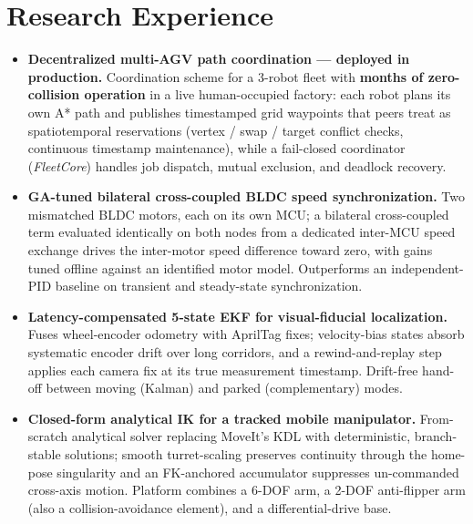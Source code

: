 \documentclass[a4paper,20pt]{article}
\begin{document}
\vspace{2pt}
\section{\textbf{Research Experience}}

\begin{itemize}[leftmargin=*]

    \item \textbf{Decentralized multi-AGV path coordination --- deployed in production.} Coordination scheme for a 3-robot fleet with \textbf{months of zero-collision operation} in a live human-occupied factory: each robot plans its own A* path and publishes timestamped grid waypoints that peers treat as spatiotemporal reservations (vertex / swap / target conflict checks, continuous timestamp maintenance), while a fail-closed coordinator (\textit{FleetCore}) handles job dispatch, mutual exclusion, and deadlock recovery. \vspace{-5pt}

    \item \textbf{GA-tuned bilateral cross-coupled BLDC speed synchronization.} Two mismatched BLDC motors, each on its own MCU; a bilateral cross-coupled term evaluated identically on both nodes from a dedicated inter-MCU speed exchange drives the inter-motor speed difference toward zero, with gains tuned offline against an identified motor model. Outperforms an independent-PID baseline on transient and steady-state synchronization. \vspace{-5pt}

    \item \textbf{Latency-compensated 5-state EKF for visual-fiducial localization.} Fuses wheel-encoder odometry with AprilTag fixes; velocity-bias states absorb systematic encoder drift over long corridors, and a rewind-and-replay step applies each camera fix at its true measurement timestamp. Drift-free hand-off between moving (Kalman) and parked (complementary) modes. \vspace{-5pt}

    \item \textbf{Closed-form analytical IK for a tracked mobile manipulator.} From-scratch analytical solver replacing MoveIt's KDL with deterministic, branch-stable solutions; smooth turret-scaling preserves continuity through the home-pose singularity and an FK-anchored accumulator suppresses un-commanded cross-axis motion. Platform combines a 6-DOF arm, a 2-DOF anti-flipper arm (also a collision-avoidance element), and a differential-drive base. \vspace{-5pt}


\end{itemize}
\end{document}
